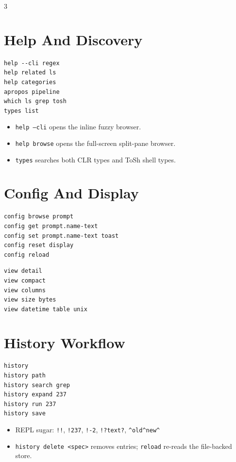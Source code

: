 \begin{multicols*}{3}

\section{Help And Discovery}
\begin{lstlisting}
help --cli regex
help related ls
help categories
apropos pipeline
which ls grep tosh
types list
\end{lstlisting}

\begin{itemize}
\item \texttt{help --cli} opens the inline fuzzy browser.
\item \texttt{help browse} opens the full-screen split-pane browser.
\item \texttt{types} searches both CLR types and ToSh shell types.
\end{itemize}

\section{Config And Display}
\begin{lstlisting}
config browse prompt
config get prompt.name-text
config set prompt.name-text toast
config reset display
config reload
\end{lstlisting}

\begin{lstlisting}
view detail
view compact
view columns
view size bytes
view datetime table unix
\end{lstlisting}


\section{History Workflow}
\begin{lstlisting}
history
history path
history search grep
history expand 237
history run 237
history save
\end{lstlisting}

\begin{itemize}
\item REPL sugar: \texttt{!!}, \texttt{!237}, \texttt{!-2}, \texttt{!?text?}, \texttt{\^{}old\^{}new\^{}}
\item \texttt{history delete <spec>} removes entries; \texttt{reload} re-reads the file-backed store.
\end{itemize}


\end{multicols*}
